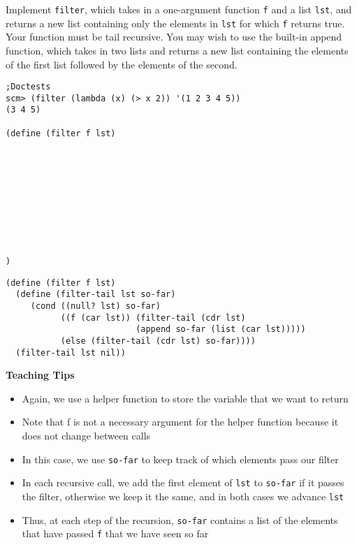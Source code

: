 \begin{blocksection}

\question Implement \texttt{filter}, which takes in a one-argument function \texttt{f} and
a list \texttt{lst}, and returns a new list containing only the elements in \texttt{lst}
for which \texttt{f} returns true. Your function must be tail recursive.
\newline
You may wish to use the built-in append function, which takes in two lists and returns a
new list containing the elements of the first list followed by the elements of the second.

\begin{lstlisting}
;Doctests
scm> (filter (lambda (x) (> x 2)) '(1 2 3 4 5))
(3 4 5)

(define (filter f lst)










)
\end{lstlisting}

\begin{solution}[0.5in]
\begin{lstlisting}
(define (filter f lst)
  (define (filter-tail lst so-far)
     (cond ((null? lst) so-far)
           ((f (car lst)) (filter-tail (cdr lst)
                          (append so-far (list (car lst)))))
           (else (filter-tail (cdr lst) so-far))))
  (filter-tail lst nil))
\end{lstlisting}
\end{solution}

\end{blocksection}

\begin{guide}
\begin{blocksection}
\textbf{Teaching Tips}
  \begin{itemize}
    \item Again, we use a helper function to store the variable that we want to return
    \item Note that f is not a necessary argument for the helper function because it does not change between calls
    \item In this case, we use \lstinline{so-far} to keep track of which elements pass our filter
    \item In each recursive call, we add the first element of \lstinline{lst} to \lstinline{so-far} if it passes the filter, otherwise we keep it the same, and in both cases we advance \lstinline{lst}
    \item Thus, at each step of the recursion, \lstinline{so-far} contains a list of the elements that have passed \lstinline{f} that we have seen so far
  \end{itemize}
\end{blocksection}
\end{guide}
